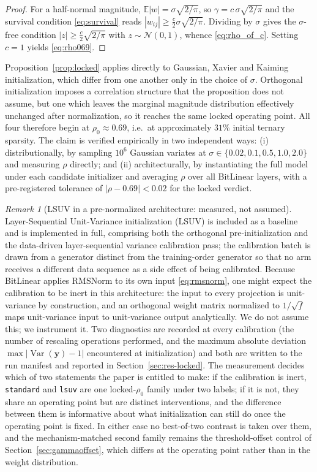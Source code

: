 \documentclass[final,5p,times,twocolumn]{elsarticle}
\theoremstyle{remark}
\newtheorem{remark}{Remark}
\newcommand{\E}{\mathbb{E}}
\newcommand{\yv}{\mathbf{y}}
\newcommand{\rhoz}{\rho_{0}}
\DeclareMathOperator{\Var}{Var}
\begin{document}
\begin{proof}
For a half-normal magnitude, $\E|w| = \sigma\sqrt{2/\pi}$, so
$\gamma = c\,\sigma\sqrt{2/\pi}$ and the survival condition
\eqref{eq:survival} reads $|w_{ij}| \geq \tfrac{c}{2}\sigma\sqrt{2/\pi}$.
Dividing by $\sigma$ gives the $\sigma$-free condition
$|z| \geq \tfrac{c}{2}\sqrt{2/\pi}$ with $z \sim \mathcal{N}(0,1)$, whence
\eqref{eq:rho_of_c}. Setting $c=1$ yields \eqref{eq:rho069}.
\end{proof}

Proposition~\ref{prop:locked} applies directly to Gaussian, Xavier and
Kaiming initialization, which differ from one another only in the choice of
$\sigma$. Orthogonal initialization imposes a correlation structure that the
proposition does not assume, but one which leaves the marginal magnitude
distribution effectively unchanged after normalization, so it reaches the same
locked operating point. All four therefore begin at
$\rhoz \approx 0.69$, i.e.\ at approximately $31\%$ initial ternary sparsity.
The claim is verified empirically in two independent ways: (i)
distributionally, by sampling $10^{6}$ Gaussian variates at
$\sigma \in \{0.02, 0.1, 0.5, 1.0, 2.0\}$ and measuring
$\rho$ directly; and (ii) architecturally, by instantiating the full model under
each candidate initializer and averaging $\rho$ over all BitLinear layers, with
a pre-registered tolerance of $|\rho - 0.69| < 0.02$ for the locked verdict.

\begin{remark}[LSUV in a pre-normalized architecture: measured, not assumed]
\label{rem:lsuv}
Layer-Sequential Unit-Variance initialization (LSUV) is included as a baseline
and is implemented in full, comprising both the orthogonal pre-initialization
and the data-driven layer-sequential variance calibration pass; the calibration
batch is drawn from a generator distinct from the training-order generator so
that no arm receives a different data sequence as a side effect of being
calibrated. Because BitLinear applies RMSNorm to its own input
\eqref{eq:rmsnorm}, one might expect the calibration to be inert in this
architecture: the input to every projection is unit-variance by construction,
and an orthogonal weight matrix normalized to $1/\sqrt{f}$ maps unit-variance
input to unit-variance output analytically. We do not assume this; we
instrument it. Two diagnostics are recorded at every calibration (the
number of rescaling operations performed, and the maximum absolute deviation
$\max|\Var(\yv)-1|$ encountered at initialization) and both are written to
the run manifest and reported in Section~\ref{sec:res-locked}. The measurement
decides which of two statements the paper is entitled to make: if the
calibration is inert, \texttt{standard} and \texttt{lsuv} are one
locked-$\rhoz$ family under two labels; if it is not, they share an operating
point but are distinct interventions, and the difference between them is
informative about what initialization can still do once the operating point is
fixed. In either case no best-of-two contrast is taken over them, and the
mechanism-matched second family remains the threshold-offset control of
Section~\ref{sec:gammaoffset}, which differs at the operating point rather than
in the weight distribution.
\end{remark}
\end{document}

